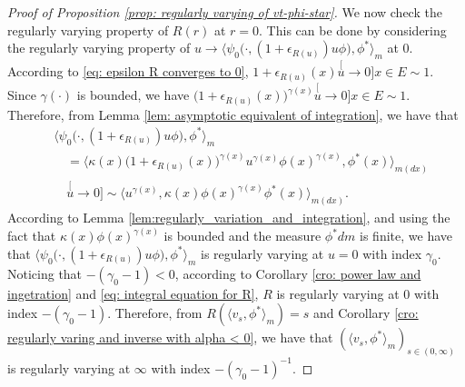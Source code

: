 \documentclass[UTF8]{pkuthss}
\theoremstyle{plain}
\theoremstyle{definition}
\numberwithin{equation}{section}
\begin{document}
\begin{proof}[Proof of Proposition \ref{prop: regularly varying of vt-phi-star}]
	We now check the regularly varying property of $R(r)$ at $r=0$.
	This can be done by considering the regularly varying property of $u\to \big\langle \psi_0 \big(\cdot ,( 1 + \epsilon_{R(u)} ) u \phi \big), \phi^* \big\rangle_m$ at 0.
    According to \eqref{eq: epsilon R converges to 0},  $1+ \epsilon_{R(u)}(x) \stackrel[u\to 0]{x\in E}{\sim} 1$.
    Since $\gamma(\cdot)$ is bounded, we have $\big(1+ \epsilon_{R(u)}(x)\big)^{\gamma(x)}\stackrel[u\to 0]{x\in E}{\sim} 1$.
	Therefore, from Lemma \ref{lem: asymptotic equivalent of integration}, we have that
\begin{align}\label{eq: regularly part in the integration}
	&\big\langle \psi_0 \big(\cdot,( 1 + \epsilon_{R(u)} ) u \phi \big), \phi^* \big\rangle_m
	\\&\quad = \big\langle \kappa (x)\big( 1 + \epsilon_{R(u)}(x)\big )^{\gamma(x)} u^{\gamma(x)} \phi(x)^{\gamma(x)} , \phi^*(x) \big\rangle_{m(dx)}
	\\ &\quad \stackrel[u\to 0]{}{\sim} \langle u^{\gamma(x)} , \kappa (x)\phi(x)^{\gamma(x)} \phi^*(x) \rangle_{m(dx)}.
\end{align}
	According to Lemma \ref{lem:regularly_variation_and_integration},
	and using the fact that $\kappa(x)\phi(x)^{\gamma(x)}$ is bounded and the measure $\phi^* dm$ is finite,
	we have that $\langle \psi_0\big(\cdot,(1+\epsilon_{R(u)})u\phi \big), \phi^* \rangle_m$ is regularly varying at $u = 0$ with index $\gamma_0$.
	Noticing that $-(\gamma_0 - 1) < 0$,
	according to Corollary \ref{cro: power law and ingetration} and \eqref{eq: integral equation for R}, $R$ is regularly varying at $0$ with index $-(\gamma_0 - 1)$.
	Therefore, from $R(\langle v_s, \phi^*\rangle_m) = s$ and Corollary \ref{cro: regularly varing and inverse with alpha < 0}, we have that $(\langle v_s, \phi^*\rangle_m)_{s\in (0,\infty)}$ is regularly varying at $\infty$ with index $-(\gamma_0 - 1)^{-1}$.
	

\end{proof}
\end{document}
